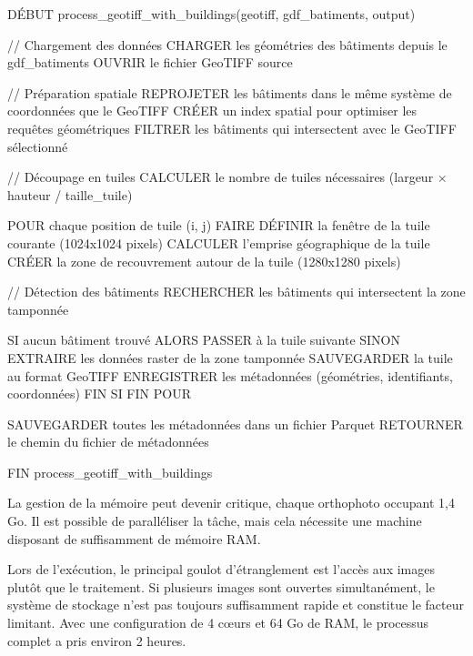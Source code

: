 \begin{code}[H]
    \begin{textcode}
    DÉBUT process_geotiff_with_buildings(geotiff, gdf_batiments, output)
        
        // Chargement des données
        CHARGER les géométries des bâtiments depuis le gdf_batiments
        OUVRIR le fichier GeoTIFF source
        
        // Préparation spatiale
        REPROJETER les bâtiments dans le même système de coordonnées que le GeoTIFF
        CRÉER un index spatial pour optimiser les requêtes géométriques
        FILTRER les bâtiments qui intersectent avec le GeoTIFF sélectionné
        
        // Découpage en tuiles
        CALCULER le nombre de tuiles nécessaires (largeur × hauteur / taille_tuile)
        
        POUR chaque position de tuile (i, j) FAIRE
            DÉFINIR la fenêtre de la tuile courante (1024x1024 pixels)
            CALCULER l'emprise géographique de la tuile
            CRÉER la zone de recouvrement autour de la tuile (1280x1280 pixels)
            
            // Détection des bâtiments
            RECHERCHER les bâtiments qui intersectent la zone tamponnée
            
            SI aucun bâtiment trouvé ALORS
                PASSER à la tuile suivante
            SINON
                EXTRAIRE les données raster de la zone tamponnée
                SAUVEGARDER la tuile au format GeoTIFF
                ENREGISTRER les métadonnées (géométries, identifiants, coordonnées)
            FIN SI
        FIN POUR
        
        SAUVEGARDER toutes les métadonnées dans un fichier Parquet
        RETOURNER le chemin du fichier de métadonnées
        
    FIN process_geotiff_with_buildings
    \end{textcode}
    \label{code:pseudo_code_decoupe_orthophotos_tuiles_1280_1280}
\end{code}

La gestion de la mémoire peut devenir critique, chaque orthophoto occupant 1,4 Go. Il est possible de paralléliser la tâche, mais cela nécessite une machine disposant de suffisamment de mémoire RAM. 

Lors de l'exécution, le principal goulot d'étranglement est l'accès aux images plutôt que le traitement. Si plusieurs images sont ouvertes simultanément, le système de stockage n'est pas toujours suffisamment rapide et constitue le facteur limitant. Avec une configuration de 4 cœurs et 64 Go de RAM, le processus complet a pris environ 2 heures.

